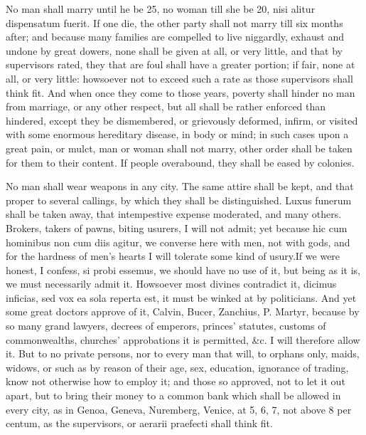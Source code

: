 {No man shall marry until he be 25, no woman till she be 20, 
nisi alitur dispensatum fuerit. If one die, the other party shall
not marry till six months after; and because many families are
compelled to live niggardly, exhaust and undone by great dowers,
none shall be given at all, or very little, and that by
supervisors rated, they that are foul shall have a greater portion; if
fair, none at all, or very little: howsoever not to exceed such a
rate as those supervisors shall think fit. And when once they come to
those years, poverty shall hinder no man from marriage, or any other
respect, but all shall be rather enforced than hindered,
except they be dismembered, or grievously deformed, infirm,
or visited with some enormous hereditary disease, in body or mind; in
such cases upon a great pain, or mulct, man or woman shall not
marry, other order shall be taken for them to their content. If people
overabound, they shall be eased by colonies.

No man shall wear weapons in any city. The same attire shall be
kept, and that proper to several callings, by which they shall be
distinguished. Luxus funerum shall be taken away, that
intempestive expense moderated, and many others. Brokers, takers of
pawns, biting usurers, I will not admit; yet because hic cum hominibus
non cum diis agitur, we converse here with men, not with gods, and for
the hardness of men's hearts I will tolerate some kind of usury.If
we were honest, I confess, si probi essemus, we should have no use of
it, but being as it is, we must necessarily admit it. Howsoever most
divines contradict it, dicimus inficias, sed vox ea sola reperta est,
it must be winked at by politicians. And yet some great doctors approve
of it, Calvin, Bucer, Zanchius, P. Martyr, because by so many grand
lawyers, decrees of emperors, princes' statutes, customs of
commonwealths, churches' approbations it is permitted, \&c. I will
therefore allow it. But to no private persons, nor to every man that
will, to orphans only, maids, widows, or such as by reason of their
age, sex, education, ignorance of trading, know not otherwise how to
employ it; and those so approved, not to let it out apart, but to bring
their money to a common bank which shall be allowed in every city,
as in Genoa, Geneva, Nuremberg, Venice, at 5, 6, 7, not above 8
per centum, as the supervisors, or aerarii praefecti shall think fit.

}
